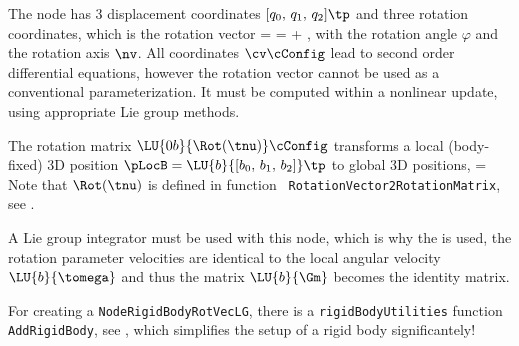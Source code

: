     The node has 3 displacement coordinates $[q_0,\,q_1,\,q_2]\tp$ and three rotation coordinates, which is the rotation vector 
    \be
      \tnu = \varphi \nv = \tnu\cConfig + \tnu\cRef,
    \ee
    with the rotation angle $\varphi$ and the rotation axis $\nv$.
    All coordinates $\cv\cConfig$ lead to second order differential equations, however the rotation vector cannot be used as a conventional parameterization. It must be computed within a nonlinear update, using appropriate Lie group methods.

    The rotation matrix $\LU{0b}{\Rot(\tnu)}\cConfig$ transforms a local (body-fixed) 3D position 
    $\pLocB = \LU{b}{[b_0,\,b_1,\,b_2]}\tp$ to global 3D positions,
    \be
      \cConfig = \cConfig {} 
    \ee
    Note that $\Rot(\tnu)$ is defined in function \texttt{ RotationVector2RotationMatrix}, see .
    
    A Lie group integrator must be used with this node, which is why the is used, the 
    rotation parameter velocities are identical to the local angular velocity $\LU{b}{\tomega}$ and thus the 
    matrix $ \LU{b}{\Gm}$ becomes the identity matrix.
    
    For creating a \texttt{NodeRigidBodyRotVecLG}, there is a \texttt{rigidBodyUtilities} function \texttt{AddRigidBody}, 
    see , which simplifies the setup of a rigid body significantely!
\newpage

